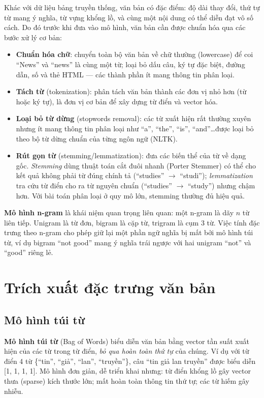Khác với dữ liệu bảng truyền thống, văn bản có đặc điểm: độ dài thay đổi, thứ tự từ mang ý nghĩa, từ vựng khổng lồ, và cùng một nội dung có thể diễn đạt vô số cách. Do đó trước khi đưa vào mô hình, văn bản cần được chuẩn hóa qua các bước xử lý cơ bản:

\begin{itemize}
    \item \textbf{Chuẩn hóa chữ}: chuyển toàn bộ văn bản về chữ thường (lowercase) để coi ``News'' và ``news'' là cùng một từ; loại bỏ dấu câu, ký tự đặc biệt, đường dẫn, số và thẻ HTML --- các thành phần ít mang thông tin phân loại.
    \item \textbf{Tách từ} (tokenization): phân tách văn bản thành các đơn vị nhỏ hơn (từ hoặc ký tự), là đơn vị cơ bản để xây dựng từ điển và vector hóa.
    \item \textbf{Loại bỏ từ dừng} (stopwords removal): các từ xuất hiện rất thường xuyên nhưng ít mang thông tin phân loại như ``a'', ``the'', ``is'', ``and''\ldots được loại bỏ theo bộ từ dừng chuẩn của từng ngôn ngữ (NLTK).
    \item \textbf{Rút gọn từ} (stemming/lemmatization): đưa các biến thể của từ về dạng gốc. \textit{Stemming} dùng thuật toán cắt đuôi nhanh (Porter Stemmer) có thể cho kết quả không phải từ đúng chính tả (``studies'' $\rightarrow$ ``studi''); \textit{lemmatization} tra cứu từ điển cho ra từ nguyên chuẩn (``studies'' $\rightarrow$ ``study'') nhưng chậm hơn. Với bài toán phân loại ở quy mô lớn, stemming thường đủ hiệu quả.
\end{itemize}

\textbf{Mô hình n-gram} là khái niệm quan trọng liên quan: một n-gram là dãy $n$ từ liên tiếp. Unigram là từ đơn, bigram là cặp từ, trigram là cụm 3 từ. Việc tính đặc trưng theo n-gram cho phép giữ lại một phần ngữ nghĩa bị mất bởi mô hình túi từ, ví dụ bigram ``not good'' mang ý nghĩa trái ngược với hai unigram ``not'' và ``good'' riêng lẻ.

\section{Trích xuất đặc trưng văn bản}

\subsection{Mô hình túi từ}

\textbf{Mô hình túi từ} (Bag of Words) biểu diễn văn bản bằng vector tần suất xuất hiện của các từ trong từ điển, \textit{bỏ qua hoàn toàn thứ tự} của chúng. Ví dụ với từ điển 4 từ \{``tin'', ``giả'', ``lan'', ``truyền''\}, câu ``tin giả lan truyền'' được biểu diễn [1, 1, 1, 1]. Mô hình đơn giản, dễ triển khai nhưng: từ điển khổng lồ gây vector thưa (sparse) kích thước lớn; mất hoàn toàn thông tin thứ tự; các từ hiếm gây nhiễu.


